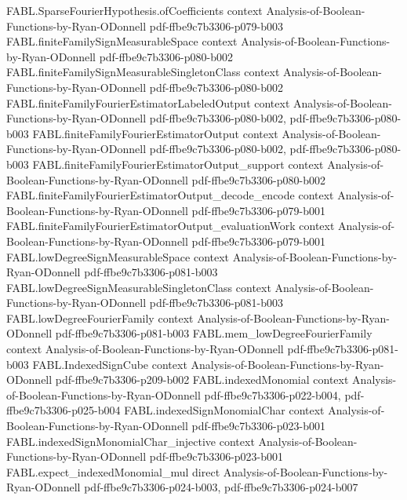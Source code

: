 \begin{theorem}
  {FABL.SparseFourierHypothesis.ofCoefficients}
  {context}
  {Analysis-of-Boolean-Functions-by-Ryan-ODonnell}
  {pdf-ffbe9c7b3306-p079-b003}
\proofstep
  {FABL.finiteFamilySignMeasurableSpace}
  {context}
  {Analysis-of-Boolean-Functions-by-Ryan-ODonnell}
  {pdf-ffbe9c7b3306-p080-b002}
\proofstep
  {FABL.finiteFamilySignMeasurableSingletonClass}
  {context}
  {Analysis-of-Boolean-Functions-by-Ryan-ODonnell}
  {pdf-ffbe9c7b3306-p080-b002}
\proofstep
  {FABL.finiteFamilyFourierEstimatorLabeledOutput}
  {context}
  {Analysis-of-Boolean-Functions-by-Ryan-ODonnell}
  {pdf-ffbe9c7b3306-p080-b002,
    pdf-ffbe9c7b3306-p080-b003}
\proofstep
  {FABL.finiteFamilyFourierEstimatorOutput}
  {context}
  {Analysis-of-Boolean-Functions-by-Ryan-ODonnell}
  {pdf-ffbe9c7b3306-p080-b002,
    pdf-ffbe9c7b3306-p080-b003}
\proofstep
  {FABL.finiteFamilyFourierEstimatorOutput_support}
  {context}
  {Analysis-of-Boolean-Functions-by-Ryan-ODonnell}
  {pdf-ffbe9c7b3306-p080-b002}
\proofstep
  {FABL.finiteFamilyFourierEstimatorOutput_decode_encode}
  {context}
  {Analysis-of-Boolean-Functions-by-Ryan-ODonnell}
  {pdf-ffbe9c7b3306-p079-b001}
\proofstep
  {FABL.finiteFamilyFourierEstimatorOutput_evaluationWork}
  {context}
  {Analysis-of-Boolean-Functions-by-Ryan-ODonnell}
  {pdf-ffbe9c7b3306-p079-b001}
\proofstep
  {FABL.lowDegreeSignMeasurableSpace}
  {context}
  {Analysis-of-Boolean-Functions-by-Ryan-ODonnell}
  {pdf-ffbe9c7b3306-p081-b003}
\proofstep
  {FABL.lowDegreeSignMeasurableSingletonClass}
  {context}
  {Analysis-of-Boolean-Functions-by-Ryan-ODonnell}
  {pdf-ffbe9c7b3306-p081-b003}
\proofstep
  {FABL.lowDegreeFourierFamily}
  {context}
  {Analysis-of-Boolean-Functions-by-Ryan-ODonnell}
  {pdf-ffbe9c7b3306-p081-b003}
\proofstep
  {FABL.mem_lowDegreeFourierFamily}
  {context}
  {Analysis-of-Boolean-Functions-by-Ryan-ODonnell}
  {pdf-ffbe9c7b3306-p081-b003}
\proofstep
  {FABL.IndexedSignCube}
  {context}
  {Analysis-of-Boolean-Functions-by-Ryan-ODonnell}
  {pdf-ffbe9c7b3306-p209-b002}
\proofstep
  {FABL.indexedMonomial}
  {context}
  {Analysis-of-Boolean-Functions-by-Ryan-ODonnell}
  {pdf-ffbe9c7b3306-p022-b004,
    pdf-ffbe9c7b3306-p025-b004}
\proofstep
  {FABL.indexedSignMonomialChar}
  {context}
  {Analysis-of-Boolean-Functions-by-Ryan-ODonnell}
  {pdf-ffbe9c7b3306-p023-b001}
\proofstep
  {FABL.indexedSignMonomialChar_injective}
  {context}
  {Analysis-of-Boolean-Functions-by-Ryan-ODonnell}
  {pdf-ffbe9c7b3306-p023-b001}
\proofstep
  {FABL.expect_indexedMonomial_mul}
  {direct}
  {Analysis-of-Boolean-Functions-by-Ryan-ODonnell}
  {pdf-ffbe9c7b3306-p024-b003,
    pdf-ffbe9c7b3306-p024-b007}

\end{theorem}
